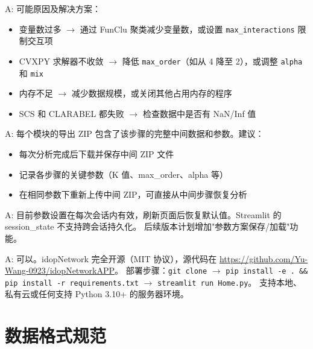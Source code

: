 \documentclass[12pt,a4paper]{ctexart}
\newcommand{\param}[1]{\texttt{#1}}
\begin{document}
\medskip
\begin{infobox}
    A: 可能原因及解决方案：
    \begin{itemize}
        \item 变量数过多 $\rightarrow$ 通过 FunClu 聚类减少变量数，或设置 \param{max\_interactions} 限制交互项
        \item CVXPY 求解器不收敛 $\rightarrow$ 降低 \param{max\_order}（如从 4 降至 2），或调整 \param{alpha} 和 \param{mix}
        \item 内存不足 $\rightarrow$ 减少数据规模，或关闭其他占用内存的程序
        \item SCS 和 CLARABEL 都失败 $\rightarrow$ 检查数据中是否有 NaN/Inf 值
    \end{itemize}
\end{infobox}

\medskip
\begin{infobox}[Q: 如何复现之前的分析结果？]
    A: 每个模块的导出 ZIP 包含了该步骤的完整中间数据和参数。建议：
    \begin{itemize}
        \item 每次分析完成后下载并保存中间 ZIP 文件
        \item 记录各步骤的关键参数（K 值、max\_order、alpha 等）
        \item 在相同参数下重新上传中间 ZIP，可直接从中间步骤恢复分析
    \end{itemize}
\end{infobox}

\medskip
\begin{infobox}[Q: 平台是否支持参数持久化保存？]
    A: 目前参数设置在每次会话内有效，刷新页面后恢复默认值。Streamlit 的 session\_state 不支持跨会话持久化。
    后续版本计划增加"参数方案保存/加载"功能。
\end{infobox}

\medskip
\begin{infobox}
    A: 可以。idopNetwork 完全开源（MIT 协议），源代码在 \url{https://github.com/Yu-Wang-0923/idopNetworkAPP}。
    部署步骤：\texttt{git clone} $\rightarrow$ \texttt{pip install -e . \&\& pip install -r requirements.txt} $\rightarrow$ \texttt{streamlit run Home.py}。
    支持本地、私有云或任何支持 Python 3.10+ 的服务器环境。
\end{infobox}

\section{数据格式规范}
\end{document}
